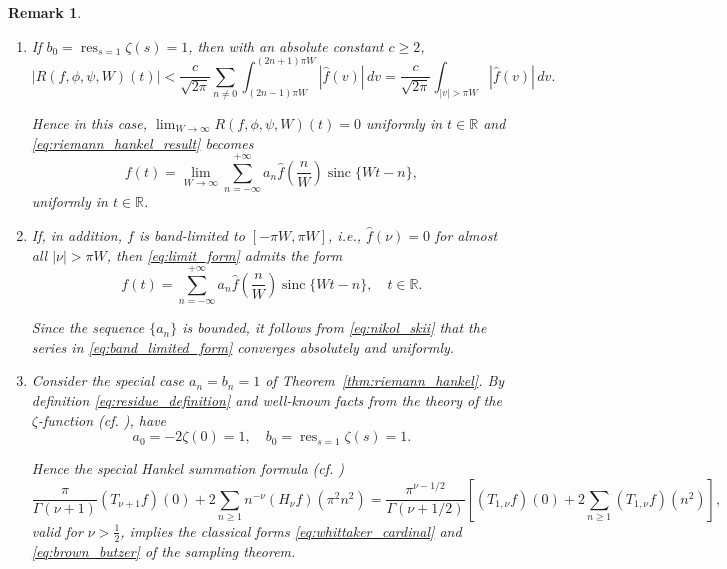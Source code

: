 \documentclass[11pt]{article}
\theoremstyle{plain}
\newtheorem{remark}[theorem]{Remark}
\begin{document}
\begin{remark}
\label{rem:sampling_remarks}
\begin{enumerate}[label=(\roman*)]
\item If $b_0 = \operatorname{res}_{s=1} \zeta(s) = 1$, then with an absolute constant $c \geq 2$,
\begin{equation}
|R(f, \phi, \psi, W)(t)| < \frac{c}{\sqrt{2\pi}} \sum_{n \neq 0} \int_{(2n-1)\pi W}^{(2n+1)\pi W} |\hat{f}(v)| \, dv = \frac{c}{\sqrt{2\pi}} \int_{|v| > \pi W} |\hat{f}(v)| \, dv.
\label{eq:remainder_zeta}
\end{equation}

Hence in this case, $\lim_{W \to \infty} R(f, \phi, \psi, W)(t) = 0$ uniformly in $t \in \mathbb{R}$ and \eqref{eq:riemann_hankel_result} becomes
\begin{equation}
f(t) = \lim_{W \to \infty} \sum_{n=-\infty}^{+\infty} a_n \hat{f}\left(\frac{n}{W}\right) \operatorname{sinc}\{Wt - n\},
\label{eq:limit_form}
\end{equation}
uniformly in $t \in \mathbb{R}$.

\item If, in addition, $f$ is band-limited to $[-\pi W, \pi W]$, i.e., $\hat{f}(\nu) = 0$ for almost all $|\nu| > \pi W$, then \eqref{eq:limit_form} admits the form
\begin{equation}
f(t) = \sum_{n=-\infty}^{+\infty} a_n \hat{f}\left(\frac{n}{W}\right) \operatorname{sinc}\{Wt - n\}, \quad t \in \mathbb{R}.
\label{eq:band_limited_form}
\end{equation}

Since the sequence $\{a_n\}$ is bounded, it follows from \eqref{eq:nikol_skii} that the series in \eqref{eq:band_limited_form} converges absolutely and uniformly.

\item Consider the special case $a_n = b_n = 1$ of Theorem~\ref{thm:riemann_hankel}. By definition \eqref{eq:residue_definition} and well-known facts from the theory of the $\zeta$-function (cf. \cite{30}), have
\begin{equation}
a_0 = -2\zeta(0) = 1, \quad b_0 = \operatorname{res}_{s=1} \zeta(s) = 1.
\label{eq:zeta_values}
\end{equation}

Hence the special Hankel summation formula (cf. \cite{17,24})
\begin{equation}
\frac{\pi}{\Gamma(\nu+1)} (T_{\nu+1} f)(0) + 2\sum_{n \geq 1} n^{-\nu} (H_\nu f)(\pi^2 n^2)
= \frac{\pi^{\nu-1/2}}{\Gamma(\nu+1/2)} \left[(T_{1,\nu} f)(0) + 2\sum_{n \geq 1} (T_{1,\nu} f)(n^2)\right],
\label{eq:special_hankel}
\end{equation}
valid for $\nu > \frac{1}{2}$, implies the classical forms \eqref{eq:whittaker_cardinal} and \eqref{eq:brown_butzer} of the sampling theorem.
\end{enumerate}
\end{remark}
\end{document}
